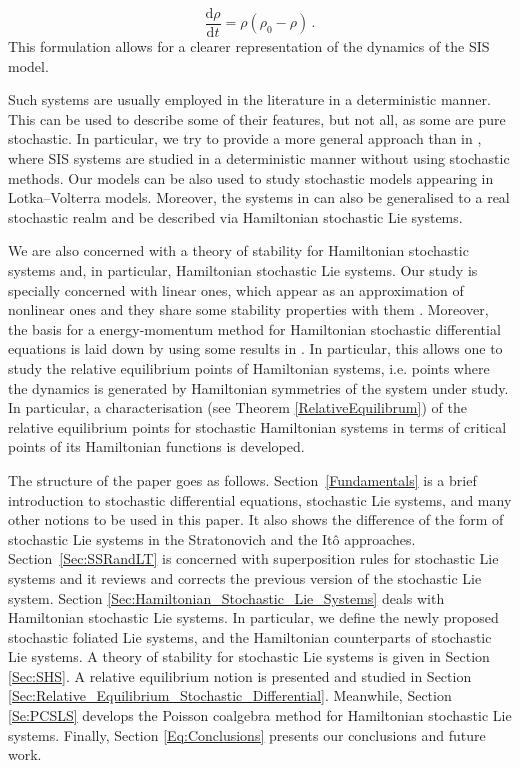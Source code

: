\documentclass[11pt]{article}
\theoremstyle{plain}
\theoremstyle{definition}
\renewcommand{\d}{\mathrm{d}}
\def\d{\mathrm{d}}
\begin{document}
\[
\frac{\d\rho}{\d t} = \rho(\rho_0-\rho)\,.
\]
This formulation allows for a clearer representation of the dynamics of the SIS model.

Such systems are usually employed in the literature in a deterministic manner. This can be used to describe some of their features, but not all, as some are pure stochastic. In particular, we try to provide a more general approach than in \cite{CFH23,EFSZ22}, where SIS systems are studied in a deterministic manner without using stochastic methods. Our models can be also used to study stochastic models appearing in Lotka--Volterra models. Moreover, the systems in \cite{CFH23} can also be generalised to a real stochastic realm and be described via Hamiltonian stochastic Lie systems. 


We are also concerned with a theory of stability for Hamiltonian stochastic systems and, in particular, Hamiltonian stochastic Lie systems. Our study is specially concerned with linear ones, which appear as an approximation of nonlinear ones and they share some stability properties with them \cite{Ar74}. Moreover, the basis for a energy-momentum method \cite{MS88} for Hamiltonian stochastic differential equations is laid down by using some results in \cite{LO08}. In particular, this allows one to study the relative equilibrium points of Hamiltonian systems, i.e. points where the dynamics is generated by Hamiltonian symmetries of the system under study. In particular, a characterisation (see Theorem \ref{RelativeEquilibrum}) of the relative equilibrium points for stochastic Hamiltonian systems in terms of critical points of its Hamiltonian functions is developed.

The structure of the paper goes as follows. 
Section~\ref{Fundamentals} is a brief introduction to stochastic differential equations, stochastic Lie systems, and many other notions to be used in this paper. It also shows the difference of the form of stochastic Lie systems in the Stratonovich and the It\^{o} approaches. Section~\ref{Sec:SSRandLT} is concerned with superposition rules for stochastic Lie systems and it reviews and corrects the previous version of the stochastic Lie system. Section \ref{Sec:Hamiltonian_Stochastic_Lie_Systems} deals with Hamiltonian stochastic Lie systems. In particular, we define the newly proposed stochastic foliated Lie systems, and the Hamiltonian counterparts of stochastic Lie systems. A theory of stability for stochastic Lie systems is given in Section \ref{Sec:SHS}. A relative equilibrium notion is presented and studied in Section \ref{Sec:Relative_Equilibrium_Stochastic_Differential}. Meanwhile, Section \ref{Se:PCSLS} develops the Poisson coalgebra method for Hamiltonian stochastic Lie systems. Finally, Section \ref{Eq:Conclusions} presents our conclusions and future work.  
\end{document}
